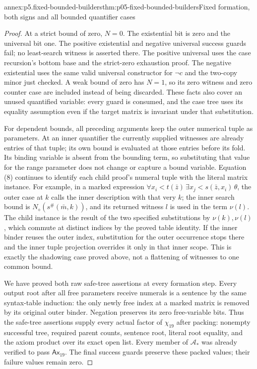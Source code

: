 \begin{annexitem}{annex:p5.fixed-bounded-builders}{thm:p05-fixed-bounded-builders}{Fixed formation, both signs and all bounded quantifier cases}
\begin{proof}
At a strict bound of zero, \(N=0\). The existential bit is zero
and the universal bit one. The positive existential and negative
universal success guards fail; no least-search witness is asserted
there. The positive universal uses the case recursion's bottom base
and the strict-zero exhaustion proof. The negative existential uses
the same valid universal constructor for \(\neg c\) and the
two-copy minor just checked. A weak bound of zero has \(N=1\),
so its zero witness and zero counter case are included instead of
being discarded. These facts also cover an unused quantified variable:
every guard is consumed, and the case tree uses its equality assumption
even if the target matrix is invariant under that substitution.

For dependent bounds, all preceding arguments keep the outer numerical
tuple as parameters. At an inner quantifier the currently supplied
witnesses are already entries of that tuple; its own bound is evaluated
at those entries before its fold. Its binding variable is absent from
the bounding term, so substituting that value for the range parameter
does not change or capture a bound variable. Equation (8) continues
to identify each child proof's numeral tuple with the literal matrix
instance. For example, in a marked expression
\(\forall x_i<t(\bar z)\,\exists x_j<s(\bar z,x_i)\,\theta\),
the outer case at \(k\) calls the inner description with that
very \(k\); the inner search bound is
\(N_\diamond(s^\#(\bar m,k))\), and its returned witness \(l\)
is used in the term \(\nu(l)\). The child instance is the result
of the two specified substitutions by \(\nu(k),\nu(l)\), which
commute at distinct indices by the proved table identity. If the
inner binder reuses the outer index, substitution for the outer
occurrence stops there and the inner tuple projection overrides it
only in that inner scope. This is exactly the shadowing case proved
above, not a flattening of witnesses to one common bound.

We have proved both raw safe-tree assertions at every formation step.
Every output root after all free parameters receive numerals is a
sentence by the same syntax-table induction: the only newly free
index at a marked matrix is removed by its original outer binder.
Negation preserves its zero free-variable bits. Thus the safe-tree
assertions supply every actual factor of \(\chi_{19}\) after
packing: nonempty successful tree, required parent counts, sentence
root, literal root equality, and the axiom product over its exact
open list. Every member of \(\mathcal A_*\) was already verified
to pass \(\mathsf{Ax}_{19}\). The final success guards preserve
these packed values; their failure values remain zero.


\end{proof}
\end{annexitem}
